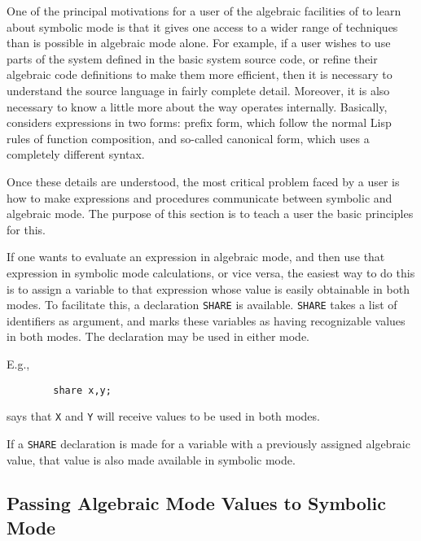 One of the principal motivations for a user of the algebraic facilities of
{\REDUCE} to learn about symbolic mode is that it
gives one access to a wider range of techniques than is possible in
algebraic mode alone.  For example, if a user
wishes to use parts of the system defined in the basic system source code,
or refine their algebraic code definitions to make them more efficient,
then it is necessary to understand the source language in fairly complete
detail.  Moreover, it is also necessary to know a little more about the
way {\REDUCE} operates internally.  Basically, {\REDUCE} considers
expressions in two forms: prefix form, which follow the normal Lisp rules
of function composition, and so-called canonical form, which uses a
completely different syntax.

Once these details are understood, the most critical problem faced by a
user is how to make expressions and procedures communicate between symbolic
and algebraic mode. The purpose of this section is to teach a user the
basic principles for this.

If one wants to evaluate an expression in algebraic mode, and then use
that expression in symbolic mode calculations, or vice versa, the easiest
way to do this is to assign a variable to that expression whose value is
easily obtainable in both modes.  To facilitate this, a declaration 
\texttt{SHARE} is available. \texttt{SHARE} takes a list of
identifiers as argument, and marks these variables as having recognizable
values in both modes.  The declaration may be used in either mode.

E.g.,
\begin{verbatim}
        share x,y;
\end{verbatim}
says that \texttt{X} and \texttt{Y} will receive values to be used in both modes.

If a \texttt{SHARE} declaration is made for a variable with a previously
assigned algebraic value, that value is also made available in symbolic
mode.

\subsection{Passing Algebraic Mode Values to Symbolic Mode}

